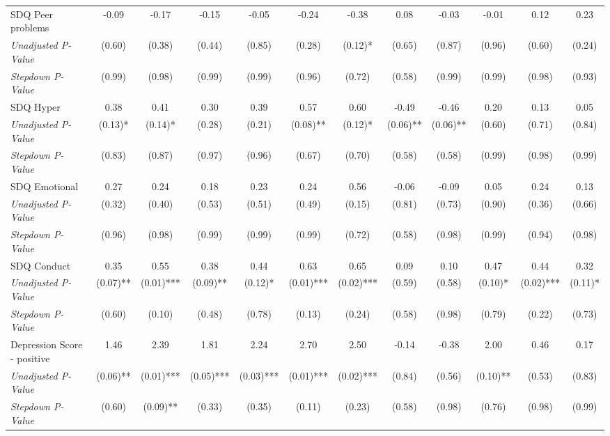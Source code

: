 \begin{tabular}{l c c c c c c c c c c c}
SDQ Peer problems & -0.09 & -0.17 & -0.15 & -0.05 & -0.24 & -0.38 & 0.08 & -0.03 & -0.01 & 0.12 & 0.23 \\
\quad \textit{Unadjusted P-Value} & (0.60) & (0.38) & (0.44) & (0.85) & (0.28) & (0.12)* & (0.65) & (0.87) & (0.96) & (0.60) & (0.24) \\
\quad \textit{Stepdown P-Value} & (0.99) & (0.98) & (0.99) & (0.99) & (0.96) & (0.72) & (0.58) & (0.99) & (0.99) & (0.98) & (0.93) \\
SDQ Hyper & 0.38 & 0.41 & 0.30 & 0.39 & 0.57 & 0.60 & -0.49 & -0.46 & 0.20 & 0.13 & 0.05 \\
\quad \textit{Unadjusted P-Value} & (0.13)* & (0.14)* & (0.28) & (0.21) & (0.08)** & (0.12)* & (0.06)** & (0.06)** & (0.60) & (0.71) & (0.84) \\
\quad \textit{Stepdown P-Value} & (0.83) & (0.87) & (0.97) & (0.96) & (0.67) & (0.70) & (0.58) & (0.58) & (0.99) & (0.98) & (0.99) \\
SDQ Emotional & 0.27 & 0.24 & 0.18 & 0.23 & 0.24 & 0.56 & -0.06 & -0.09 & 0.05 & 0.24 & 0.13 \\
\quad \textit{Unadjusted P-Value} & (0.32) & (0.40) & (0.53) & (0.51) & (0.49) & (0.15) & (0.81) & (0.73) & (0.90) & (0.36) & (0.66) \\
\quad \textit{Stepdown P-Value} & (0.96) & (0.98) & (0.99) & (0.99) & (0.99) & (0.72) & (0.58) & (0.98) & (0.99) & (0.94) & (0.98) \\
SDQ Conduct & 0.35 & 0.55 & 0.38 & 0.44 & 0.63 & 0.65 & 0.09 & 0.10 & 0.47 & 0.44 & 0.32 \\
\quad \textit{Unadjusted P-Value} & (0.07)** & (0.01)*** & (0.09)** & (0.12)* & (0.01)*** & (0.02)*** & (0.59) & (0.58) & (0.10)* & (0.02)*** & (0.11)* \\
\quad \textit{Stepdown P-Value} & (0.60) & (0.10) & (0.48) & (0.78) & (0.13) & (0.24) & (0.58) & (0.98) & (0.79) & (0.22) & (0.73) \\
Depression Score - positive & 1.46 & 2.39 & 1.81 & 2.24 & 2.70 & 2.50 & -0.14 & -0.38 & 2.00 & 0.46 & 0.17 \\
\quad \textit{Unadjusted P-Value} & (0.06)** & (0.01)*** & (0.05)*** & (0.03)*** & (0.01)*** & (0.02)*** & (0.84) & (0.56) & (0.10)** & (0.53) & (0.83) \\
\quad \textit{Stepdown P-Value} & (0.60) & (0.09)** & (0.33) & (0.35) & (0.11) & (0.23) & (0.58) & (0.98) & (0.76) & (0.98) & (0.99) \\
\bottomrule
\end{tabular}
